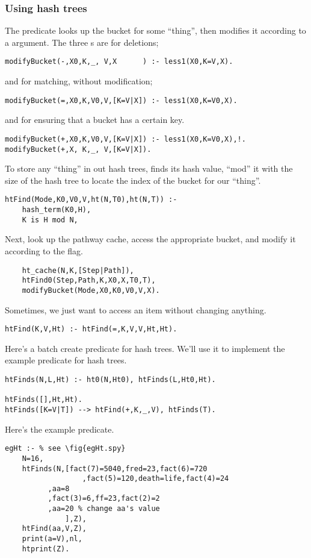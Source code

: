 \subsubsection{Using hash trees
}
\label{sec:usingHashTrees}
The  predicate looks up
the bucket for some ``thing'', then modifies
it according to a  argument. The three
s are  for deletions;
\begin{Verbatim}
modifyBucket(-,X0,K,_, V,X      ) :- less1(X0,K=V,X).
\end{Verbatim}
and  for matching, without modification;
\begin{Verbatim}
modifyBucket(=,X0,K,V0,V,[K=V|X]) :- less1(X0,K=V0,X).
\end{Verbatim}
and  for ensuring that
a bucket has a certain key.
\begin{Verbatim}
modifyBucket(+,X0,K,V0,V,[K=V|X]) :- less1(X0,K=V0,X),!.
modifyBucket(+,X, K,_, V,[K=V|X]).
\end{Verbatim}
To store any ``thing'' in out hash trees,
finds its hash value, ``mod'' it with the
size of the hash tree to locate the index of
the bucket for our ``thing''.
\begin{Verbatim}
htFind(Mode,K0,V0,V,ht(N,T0),ht(N,T)) :-
	hash_term(K0,H),
	K is H mod N,
\end{Verbatim}
Next, look up the pathway cache,
access the appropriate bucket,
and modify it according to the  flag.
\begin{Verbatim}
	ht_cache(N,K,[Step|Path]),
	htFind0(Step,Path,K,X0,X,T0,T),
	modifyBucket(Mode,X0,K0,V0,V,X).
\end{Verbatim}
Sometimes, we just want to access an item without
changing anything.
\begin{Verbatim}
htFind(K,V,Ht) :- htFind(=,K,V,V,Ht,Ht).
\end{Verbatim}
Here's a batch create predicate for hash trees.
We'll use it to implement the example predicate
for hash trees.
\begin{Verbatim}
htFinds(N,L,Ht) :- ht0(N,Ht0), htFinds(L,Ht0,Ht).

htFinds([],Ht,Ht).
htFinds([K=V|T]) --> htFind(+,K,_,V), htFinds(T).
\end{Verbatim}
Here's the example predicate.
\begin{Verbatim}
egHt :- % see \fig{egHt.spy}
	N=16,
	htFinds(N,[fact(7)=5040,fred=23,fact(6)=720
                  ,fact(5)=120,death=life,fact(4)=24
		  ,aa=8
		  ,fact(3)=6,ff=23,fact(2)=2
		  ,aa=20 % change aa's value
	          ],Z),
	htFind(aa,V,Z),
	print(a=V),nl,
	htprint(Z).
\end{Verbatim}
